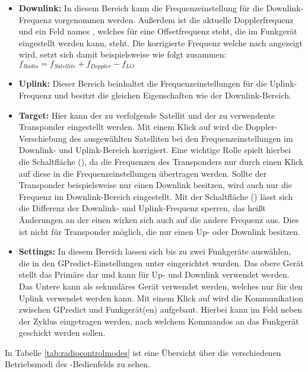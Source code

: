 \begin{itemize}
	\parskip0pt
	\item \textbf{Downlink:} In diesem Bereich kann die Frequenzeinstellung für die Downlink-Frequenz vorgenommen werden. Außerdem ist die aktuelle Dopplerfrequenz und ein Feld names , welches für eine Offsetfrequenz steht, die im Funkgerät eingestellt werden kann, steht. Die korrigierte Frequenz welche nach  angezeigt wird, setzt sich damit beispielsweise wie folgt zusammen: \\ $f_{Radio} = f_{Satellite} + f_{Doppler} - f_{LO}$
	\item \textbf{Uplink:} Dieser Bereich beinhaltet die Frequenzeinstellungen für die Uplink-Frequenz und besitzt die gleichen Eigenschaften wie der Downlink-Bereich.
	\item \textbf{Target:} Hier kann der zu verfolgende Satellit und der zu verwendente Transponder eingestellt werden. Mit einem Klick auf  wird die Doppler-Verschiebung des ausgewählten Satelliten bei den Frequenzeinstellungen im Downlink- und Uplink-Bereich korrigiert. Eine wichtige Rolle spielt hierbei die Schaltfläche  (), da die Frequenzen des Transponders nur durch einen Klick auf diese in die Frequenzeinstellungen übertragen werden. Sollte der Transponder beispielsweise nur einen Down\-link besitzen, wird auch nur die Frequenz im Downlink-Bereich eingestellt.
	Mit der Schaltfläche  () lässt sich die Differenz der Downlink- und Uplink-Frequenz sperren, das heißt Änderungen an der einen wirken sich auch auf die andere Frequenz aus. Dies ist nicht für Transponder möglich, die nur einen Up- oder Downlink besitzen.
	\item \textbf{Settings:} In diesem Bereich lassen sich bis zu zwei Funkgeräte auswählen, die in den GPredict-Einstellungen unter  eingerichtet wurden. Das obere Gerät stellt das Primäre dar und kann für Up- und Downlink verwendet werden. Das Untere kann als sekundäres Gerät verwendet werden, welches nur für den Uplink verwendet werden kann. Mit einem Klick auf  wird die Kommunikation zwischen GPredict und Funkgerät(en) aufgebaut. Hierbei kann im Feld neben  der Zyklus eingetragen werden, nach welchem Kommandos an das Funkgerät geschickt werden sollen.
\end{itemize}

In Tabelle \ref{tab:radiocontrolmodes} ist eine Übersicht über die verschiedenen Betriebsmodi des -Bedienfelds zu sehen.

